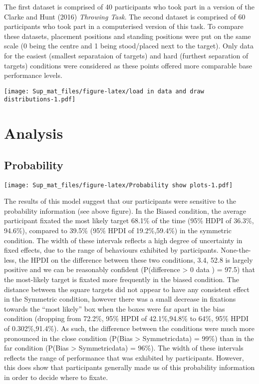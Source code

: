 \documentclass[
]{article}
\begin{document}
The first dataset is comprised of 40 participants who took part in a version of the Clarke and Hunt (2016) \emph{Throwing Task}. The second dataset is comprised of 60 participants who took part in a computerised version of this task. To compare these datasets, placement positions and standing positions were put on the same scale (0 being the centre and 1 being stood/placed next to the target). Only data for the easiest (smallest separataion of targets) and hard (furthest separation of targets) conditions were considered as these points offered more comparable base performance levels.

\texttt{[image: Sup\_mat\_files/figure-latex/load in data and draw distributions-1.pdf]}

\hypertarget{analysis}{%
\section{Analysis}\label{analysis}}

\hypertarget{probability-1}{%
\subsection{Probability}\label{probability-1}}

\texttt{[image: Sup\_mat\_files/figure-latex/Probability show plots-1.pdf]}

The results of this model suggest that our participants were sensitive to the probability information (see above figure). In the Biased condition, the average participant fixated the most likely target 68.1\% of the time (95\% HDPI of \textbar{}36.3\%, 94.6\%\textbar{}), compared to 39.5\% (95\% HPDI of \textbar{}19.2\%,59.4\%\textbar{}) in the symmetric condition. The width of these intervals reflects a high degree of uncertainty in fixed effects, due to the range of behaviours exhibited by participants. None-the-less, the HPDI on the difference between these two conditions, \textbar{}3.4, 52.8\textbar{} is largely positive and we can be reasonably confident (P(difference \textgreater{} 0 \textbar{} data ) = 97.5) that the most-likely target is fixated more frequently in the biased condition. The distance between the square targets did not appear to have any consistent effect in the Symmetric condition, however there was a small decrease in fixations towards the ``most likely'' box when the boxes were far apart in the bias condition (dropping from 72.2\%, 95\% HPDI of \textbar{}42.1\%,94.8\%\textbar{} to 64\%, 95\% HPDI of \textbar{}0.302\%,91.4\%\textbar{}). As such, the difference between the conditions were much more pronounced in the close condition (P(Bias \textgreater{} Symmetric\textbar{}data) = 99\%) than in the far condition (P(Bias \textgreater{} Symmetric\textbar{}data) = 96\%). The width of these intervals reflects the range of performance that was exhibited by participants. However, this does show that participants generally made us of this probability information in order to decide where to fixate.
\end{document}
